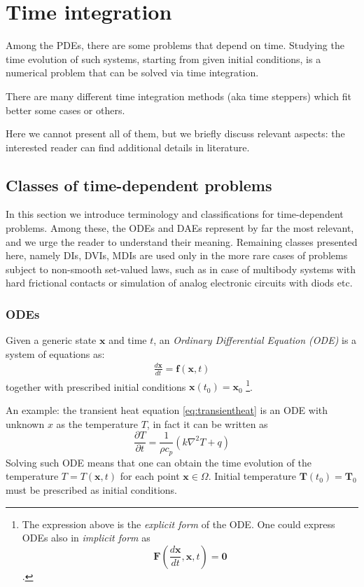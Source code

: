 \documentclass{digitaldynamics}
\def\vect#1{\bm{#1}}
\begin{document}
\newpage
\section{Time integration}

Among the PDEs, there are some problems that depend on time. Studying the time evolution of such systems, starting from given 
initial conditions, is a numerical problem that can be solved via time integration. 

There are many different time integration 
methods (aka time steppers) which fit better some cases or others. 

Here we cannot present all of them, but we briefly 
discuss relevant aspects: the interested reader can find additional details in literature.



\subsection{Classes of time-dependent problems}


In this section we introduce terminology and classifications for time-dependent problems.
Among these, the ODEs and DAEs represent by far the most relevant, and we urge the reader to 
understand their meaning. Remaining classes presented here, namely DIs, DVIs, MDIs are used
only in the more rare cases of problems subject to non-smooth set-valued laws, such as in
case of multibody systems with hard frictional contacts or simulation of analog electronic 
circuits with diods etc.


\subsubsection{ODEs}

Given a generic state $\vect{x}$ and time $t$, an \textit{Ordinary Differential Equation (ODE)} is a system of equations as:
%
\begin{align}
  \frac{d\vect{\vect{x}}}{dt}  = \vect{f} \left( \vect{x}, t\right)
\end{align}
%
together with prescribed initial conditions $\vect{x}(t_0)=\vect{x}_0$ 
\footnote{The expression above is the \textit{explicit form} of the ODE. One could express ODEs also in \textit{implicit form} as 
\[
\vect{F} \left( \frac{d\vect{\vect{x}}}{dt}, \vect{x}, t\right) = \vect{0}
\].
}.

An example: the transient heat equation \eqref{eq:transientheat} is an ODE with unknown $x$ as the temperature $T$, 
in fact it can be written as 
\[
\frac{\partial T}{\partial t} = \frac{1}{\rho c_p}\left(k\nabla^2 T + q\right)
\]
Solving such ODE means that one can obtain the time evolution of the temperature $T=T(\vect{x},t)$ for each point $\vect{x} \in \Omega$. Initial temperature
$\vect{T}(t_0)=\vect{T}_0$ must be prescribed as initial conditions.
\end{document}
